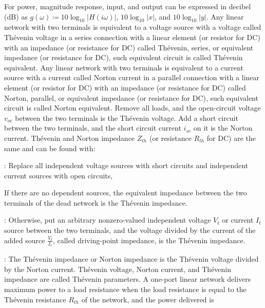 \documentclass[a4paper,12pt]{article}
\begin{document}
For power, magnitude response, input, and output can be expressed in decibel (dB) as $g(\omega)\coloneq 10\log_{10}|H(i\omega)|$, $10\log_{10}|x|$, and $10\log_{10}|y|$.
Any linear network with two terminals is equivalent to a voltage source with a voltage called Thévenin voltage in a series connection with a linear element (or resistor for DC) with an impedance (or resistance for DC) called Thévenin, series, or equivalent impedance (or resistance for DC), such equivalent circuit is called Thévenin equivalent.
Any linear network with two terminals is equivalent to a current source with a current called Norton current in a parallel connection with a linear element (or resistor for DC) with an impedance (or resistance for DC) called Norton, parallel, or equivalent impedance (or resistance for DC), such equivalent circuit is called Norton equivalent.
Remove all loads, and the open-circuit voltage $v_{oc}$ between the two terminals is the Thévenin voltage.
Add a short circuit between the two terminals, and the short circuit current $i_{sc}$ on it is the Norton current.
Thévenin and Norton impedance $Z_{th}$ (or resistance $R_{th}$ for DC) are the same and can be found with:
\bit
\item {}: Replace all independent voltage sources with short circuits and independent current sources with open circuits,
\bit
\item If there are no dependent sources, the equivalent impedance between the two terminals of the dead network is the Thévenin impedance.
\item {}: Otherwise, put an arbitrary nonzero-valued independent voltage $V_t$ or current $I_t$ source between the two terminals, and the voltage divided by the current of the added source $\frac{V_t}{I_t}$, called driving-point impedance, is the Thévenin impedance.
\eit
\item {}: The Thévenin impedance or Norton impedance is the Thévenin voltage divided by the Norton current.
\eit
{}
Thévenin voltage, Norton current, and Thévenin impedance are called Thévenin parameters.
A one-port linear network delivers maximum power to a load resistance when the load resistance is equal to the Thévenin resistance $R_{th}$ of the network, and the power delivered is
\end{document}

